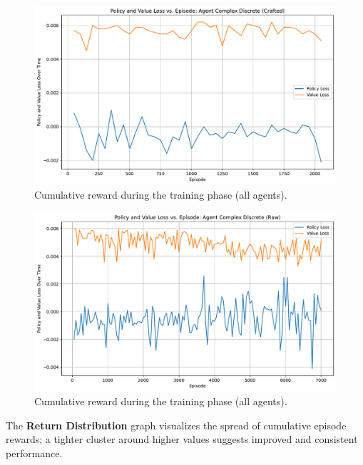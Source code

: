 \documentclass[sigconf]{acmart}
\begin{document}
\begin{figure}[t]
  \centering
  \includegraphics[width=\textwidth]{policy_value_loss_Complex Discrete (Crafted).pdf}
  \caption{Cumulative reward during the training phase (all agents).}
  \label{fig:policy_value_loss_Complex Discrete (Crafted)}
\end{figure}

\begin{figure}[t]
  \centering
  \includegraphics[width=\textwidth]{policy_value_loss_Complex Discrete (Raw).pdf}
  \caption{Cumulative reward during the training phase (all agents).}
  \label{fig:policy_value_loss_Complex Discrete (Raw)}
\end{figure}

The \textbf{Return Distribution} graph visualizes the spread of cumulative episode rewards; a tighter cluster around higher values suggests improved and consistent performance. 
\end{document}
